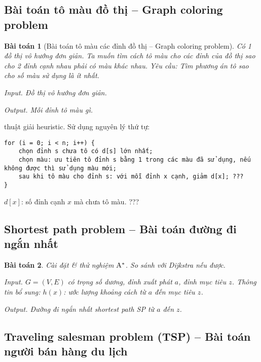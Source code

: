 \documentclass{article}
\newtheorem{baitoan}{Bài toán}
\begin{document}

\subsection{Bài toán tô màu đồ thị -- Graph coloring problem}

\begin{baitoan}[Bài toán tô màu các đỉnh đồ thị -- Graph coloring problem]
	Có 1 đồ thị vô hướng đơn giản. Ta muốn tìm cách tô màu cho các đỉnh của đồ thị sao cho 2 đỉnh cạnh nhau phải có màu khác nhau. Yêu cầu: Tìm phương án tô sao cho số màu sử dụng là ít nhất.
	\item {\sf Input.} Đồ thị vô hướng đơn giản.
	\item {\sf Output.} Mỗi đỉnh tô màu gì.
\end{baitoan}
{ thuật giải heuristic.} Sử dụng nguyên lý thứ tự:
\begin{verbatim}
for (i = 0; i < n; i++) {
    chọn đỉnh s chưa tô có d[s] lớn nhất;
    chọn màu: ưu tiên tô đỉnh s bằng 1 trong các màu đã sử dụng, nếu không được thì sử dụng màu mới;
    sau khi tô màu cho đỉnh s: với mỗi đỉnh x cạnh, giảm d[x]; ???
}
\end{verbatim}
$d[x]$: số đỉnh cạnh $x$ mà chưa tô màu. ???


\subsection{Shortest path problem -- Bài toán đường đi ngắn nhất}

\begin{baitoan}
	Cài đặt \& thử nghiệm $\rm A^*$. So sánh với Dijkstra nếu được.
	\item {\sf Input.} $G = (V,E)$ có trọng số dương, đỉnh xuất phát $a$, đỉnh mục tiêu $z$. Thông tin bổ sung: $h(x)$: ước lượng khoảng cách từ $a$ đến mục tiêu $z$.
	\item {\sf Output.} Đường đi ngắn nhất shortest path SP từ $a$ đến $z$.
\end{baitoan}


\subsection{Traveling salesman problem (TSP) -- Bài toán người bán hàng du lịch}
\end{document}

